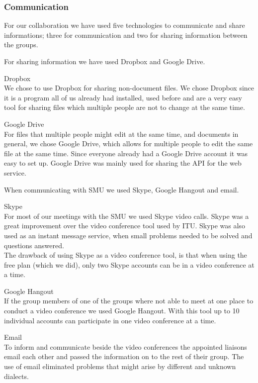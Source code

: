 \subsubsection{Communication}
For our collaboration we have used five technologies to communicate and share informations; three for communication and two for sharing information between the groups.

For sharing information we have used Dropbox and Google Drive. \vspace{-5mm}
\begin{description}
	\item Dropbox \\
		We chose to use Dropbox for sharing non-document files. We chose Dropbox since it is a program all of us already had installed, used before and are a very easy tool for sharing files which multiple people are not to change at the same time.
	\item Google Drive \\
		For files that multiple people might edit at the same time, and documents in general, we chose Google Drive, which allows for multiple people to edit the same file at the same time. Since everyone already had a Google Drive account it was easy to set up.
		Google Drive was mainly used for sharing the API for the web service.
\end{description}

When communicating with SMU we used Skype, Google Hangout and email.
\vspace{-5mm}
\begin{description}
	\item Skype \\
		For most of our meetings with the SMU we used Skype video calls. Skype was a great improvement over the video conference tool used by ITU.
		Skype was also used as an instant message service, when small problems needed to be solved and questions answered. \\
		The drawback of using Skype as a video conference tool, is that when using the free plan (which we did), only two Skype accounts can be in a video conference at a time.
	\item Google Hangout \\
		If the group members of one of the groups where not able to meet at one place to conduct a video conference we used Google Hangout. With this tool up to 10 individual accounts can participate in one video conference at a time.
	\item Email \\
		To inform and communicate beside the video conferences the appointed liaisons email each other and passed the information on to the rest of their group.
		The use of email eliminated problems that might arise by different and unknown dialects.
\end{description}